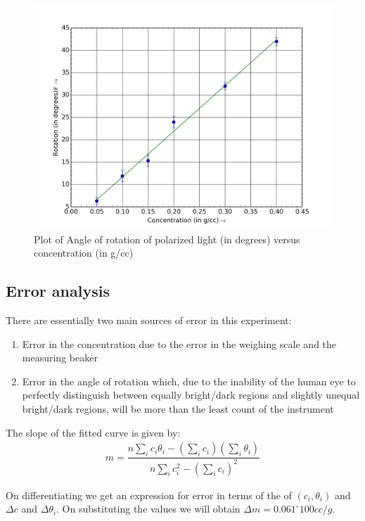 \documentclass{dkpinto-report}
\begin{document}
\begin{figure}[H]
\centering
\includegraphics[scale=0.7]{Images/Plot.png}
\caption{Plot of Angle of rotation of polarized light (in degrees) versus concentration (in g/cc)}
\end{figure}


\subsection{Error analysis}
There are essentially two main sources of error in this experiment:
\begin{enumerate}
\item Error in the concentration due to the error in the weighing scale and the measuring beaker
\item Error in the angle of rotation which, due to the inability of the human eye to perfectly distinguish between equally bright/dark regions and slightly unequal bright/dark regions, will be more than the least count of the instrument
\end{enumerate} 

The slope of the fitted curve is given by:
\begin{align*}
m = \dfrac{n\sum_i c_i \theta_i - (\sum_i c_i)(\sum_i \theta_i)}{n\sum_i c_{i}^{2} -  (\sum_i c_i)^2}
\end{align*}

On differentiating we get an expression for error in terms of the of $(c_i, \theta_i)$ and $\Delta c$ and $\Delta \theta_i$. On substituting the values we will obtain $\Delta m = 0.061 ^{\circ} 100 cc / g$. 
\end{document}
